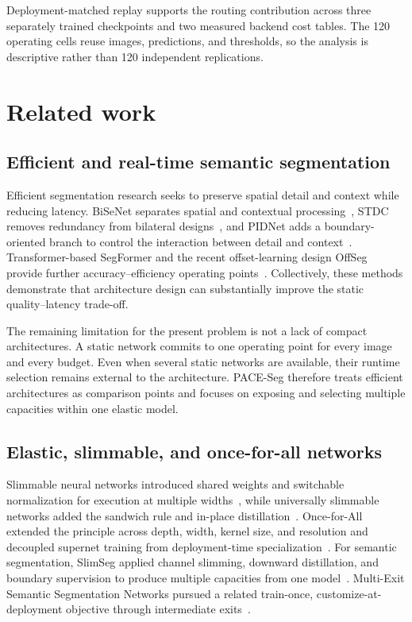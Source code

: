 \documentclass[a4paper,review,12pt]{elsarticle}
\newcommand{\method}{PACE-Seg}
\begin{document}
Deployment-matched replay supports the routing contribution across three separately trained checkpoints and two measured backend cost tables. The 120 operating cells reuse images, predictions, and thresholds, so the analysis is descriptive rather than 120 independent replications.

\section{Related work}
\label{sec:related}

\subsection{Efficient and real-time semantic segmentation}

Efficient segmentation research seeks to preserve spatial detail and context while reducing latency. BiSeNet separates spatial and contextual processing~\cite{yu2018bisenet}, STDC removes redundancy from bilateral designs~\cite{fan2021stdc}, and PIDNet adds a boundary-oriented branch to control the interaction between detail and context~\cite{xu2023pidnet}. Transformer-based SegFormer and the recent offset-learning design OffSeg provide further accuracy--efficiency operating points~\cite{xie2021segformer,zhang2025offseg}. Collectively, these methods demonstrate that architecture design can substantially improve the static quality--latency trade-off.

The remaining limitation for the present problem is not a lack of compact architectures. A static network commits to one operating point for every image and every budget. Even when several static networks are available, their runtime selection remains external to the architecture. \method{} therefore treats efficient architectures as comparison points and focuses on exposing and selecting multiple capacities within one elastic model.

\subsection{Elastic, slimmable, and once-for-all networks}

Slimmable neural networks introduced shared weights and switchable normalization for execution at multiple widths~\cite{yu2019slimmable}, while universally slimmable networks added the sandwich rule and in-place distillation~\cite{yu2019usnet}. Once-for-All extended the principle across depth, width, kernel size, and resolution and decoupled supernet training from deployment-time specialization~\cite{cai2020ofa}. For semantic segmentation, SlimSeg applied channel slimming, downward distillation, and boundary supervision to produce multiple capacities from one model~\cite{xue2022slimseg}. Multi-Exit Semantic Segmentation Networks pursued a related train-once, customize-at-deployment objective through intermediate exits~\cite{kouris2022mess}.
\end{document}
